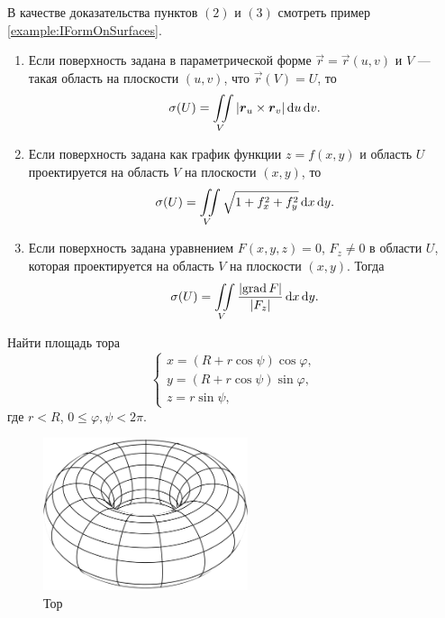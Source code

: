 \begin{example} В качестве доказательства пунктов $(2)$ и $(3)$ смотреть пример \ref{example:IFormOnSurfaces}.
	\begin{enumerate}[nolistsep, label=(\arabic*)]
		\item Если поверхность задана в параметрической форме $\vec{r} = \vec{r}(u, v)$ и $V$ --- такая область на плоскости $(u, v)$, что $\vec{r}(V) = U$, то
			\[
				\sigma(U) = \iint\limits_{V}\left\lvert\boldsymbol{r}_u \times \boldsymbol{r}_v\right\rvert\mathop{}\!\mathrm{d} u\mathop{}\!\mathrm{d} v.
			\]
		\item Если поверхность задана как график функции $z = f(x, y)$ и область $U$ проектируется на область $V$ на плоскости $(x, y)$, то
			\[
				\sigma(U) = \iint\limits_{V}\sqrt{1 + f_x^2 + f_y^2}\mathop{}\!\mathrm{d} x\mathop{}\!\mathrm{d} y.
			\]
		\item Если поверхность задана уравнением $F(x, y, z) = 0$, $F_z \ne 0$ в области $U$, которая проектируется на область $V$ на плоскости $(x, y)$. Тогда
			\[
				\sigma(U) = \iint\limits_{V}\frac{\left\lvert\operatorname{grad} F\right\rvert}{\left\lvert F_z\right\rvert}\mathop{}\!\mathrm{d} x\mathop{}\!\mathrm{d} y.
			\]
	\end{enumerate}
\end{example}

\begin{problem}
	Найти площадь тора
	\[
		\begin{cases}
			x = (R + r\cos\psi)\cos\varphi,\\
			y = (R + r\cos\psi)\sin\varphi,\\
			z = r\sin\psi,
		\end{cases}
	\]
	где $r < R$, $0 \leqslant \varphi, \psi < 2\pi$.
\end{problem}

\begin{figure}[H]
	\centering
	\includegraphics[width=6cm]{./img/Torus.pdf}
	\caption{Тор}
\end{figure}

